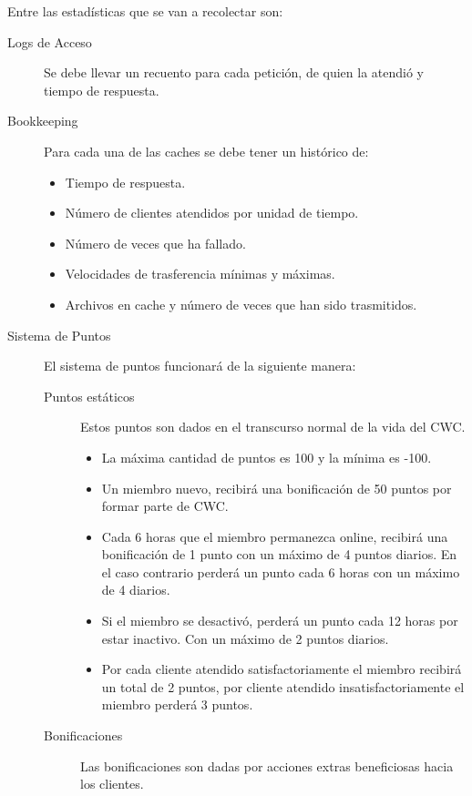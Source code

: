 Entre las estadísticas que se van a recolectar son:

\begin{description}
\item[Logs de Acceso] Se debe llevar un recuento para cada petición, de quien la atendió y tiempo de respuesta.

\item[Bookkeeping] Para cada una de las caches se debe tener un histórico de:
	\begin{itemize}
	\item Tiempo de respuesta.
	\item Número de clientes atendidos por unidad de tiempo.
	\item Número de veces que ha fallado.
	\item Velocidades de trasferencia mínimas y máximas.
	\item Archivos en cache y número de veces que han sido trasmitidos.
	\end{itemize}
	
\item[Sistema de Puntos] El sistema de puntos funcionará de la siguiente manera:

	\begin{description}
	\item[Puntos estáticos] Estos puntos son dados en el transcurso normal de la vida del CWC.
		\begin{itemize}
		\item La máxima cantidad de puntos es 100 y la mínima es -100.
		\item  Un miembro nuevo, recibirá una bonificación de 50 puntos por formar parte de CWC.
		\item Cada 6 horas que el miembro permanezca online, recibirá una bonificación de 1 punto con un máximo de 4 puntos diarios. En el caso contrario perderá un punto cada 6 horas con un máximo de 4 diarios.
		\item  Si el miembro se desactivó, perderá un punto cada 12 horas por estar inactivo. Con un máximo de 2 puntos diarios.
		\item Por cada cliente atendido satisfactoriamente el miembro recibirá un total de 2 puntos, por cliente atendido insatisfactoriamente el miembro perderá 3 puntos.
		\end{itemize}
		 
	\item[Bonificaciones] Las bonificaciones son dadas por acciones extras beneficiosas hacia los clientes. 
	

\end{description}
\end{description}
